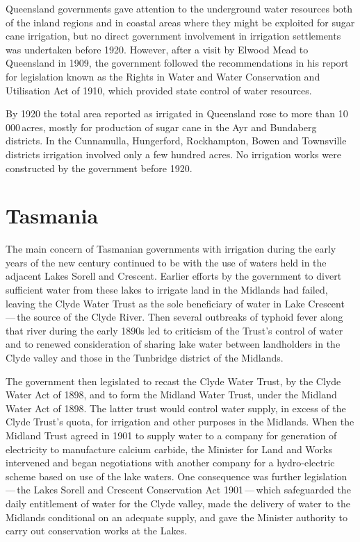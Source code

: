 Queensland governments gave attention to the underground water
resour\-ces both of the inland regions and in coastal areas where they
might be exploited for sugar cane irrigation, but no direct government
involvement in irrigation settlements was undertaken before 1920.
However, after a visit by Elwood Mead  to Queensland
in 1909, the government followed the recommendations in his report for
legislation known as the Rights in Water and Water Conservation and
Utilisation Act of 1910, which provided state control of water
resources.

By 1920 the total area reported as irrigated in Queensland rose to
more than 10\,000\,acres, mostly for production of sugar cane in the
Ayr and Bundaberg districts.  In the Cunnamulla, Hungerford,
Rockhampton, Bowen and Townsville districts irrigation involved only a
few hundred acres.  No irrigation works were constructed by the
government before 1920.

\section*{Tasmania}

The main concern of Tasmanian governments with irrigation during the
early years of the new century continued to be with the use of waters
held in the adjacent Lakes Sorell  and Crescent.
 Earlier efforts by the government to divert
sufficient water from these lakes to irrigate land in the Midlands had
failed, leaving the Clyde Water Trust as the sole beneficiary of water
in Lake Crescent\,---\,the source of the Clyde
River.  Then several outbreaks of typhoid fever
along that river during the early 1890s led to criticism of the
Trust's control of water and to renewed consideration of sharing lake
water between landholders in the Clyde valley and those in the
Tunbridge district of the Midlands.

The government then legislated to recast the Clyde Water Trust,
 by the
Clyde Water Act of 1898, and to form the Midland Water Trust, under
the Midland Water Act of 1898.  The latter trust would control water
supply, in excess of the Clyde Trust's quota, for irrigation and other
purposes in the Midlands.  When the Midland Trust agreed in 1901 to
supply water to a company for generation of electricity to manufacture
calcium carbide, the Minister for Land and Works intervened and began
negotiations with another company for a hydro-electric
 scheme based on
use of the lake waters.  One consequence was further
legislation\,---\,the Lakes Sorell and Crescent Conservation Act
1901\,---\,which safeguarded the daily entitlement of water for the
Clyde valley, made the delivery of water to the Midlands conditional
on an adequate supply, and gave the Minister authority to carry out
conservation works at the Lakes.

